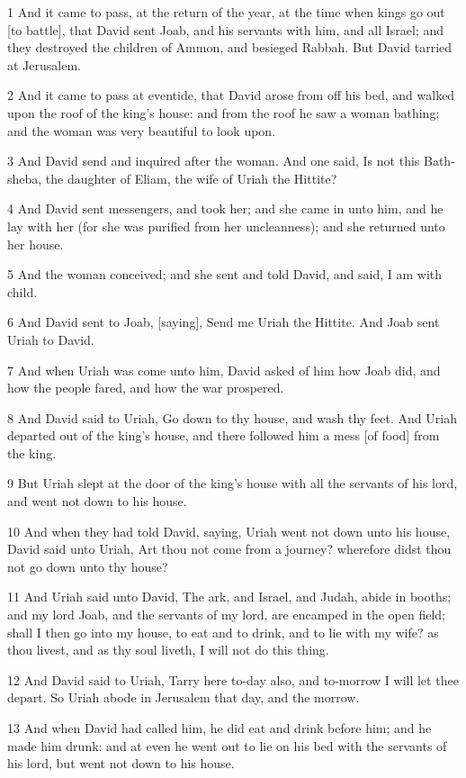 \par 1 And it came to pass, at the return of the year, at the time when kings go out [to battle], that David sent Joab, and his servants with him, and all Israel; and they destroyed the children of Ammon, and besieged Rabbah. But David tarried at Jerusalem.
\par 2 And it came to pass at eventide, that David arose from off his bed, and walked upon the roof of the king's house: and from the roof he saw a woman bathing; and the woman was very beautiful to look upon.
\par 3 And David send and inquired after the woman. And one said, Is not this Bath-sheba, the daughter of Eliam, the wife of Uriah the Hittite?
\par 4 And David sent messengers, and took her; and she came in unto him, and he lay with her (for she was purified from her uncleanness); and she returned unto her house.
\par 5 And the woman conceived; and she sent and told David, and said, I am with child.
\par 6 And David sent to Joab, [saying], Send me Uriah the Hittite. And Joab sent Uriah to David.
\par 7 And when Uriah was come unto him, David asked of him how Joab did, and how the people fared, and how the war prospered.
\par 8 And David said to Uriah, Go down to thy house, and wash thy feet. And Uriah departed out of the king's house, and there followed him a mess [of food] from the king.
\par 9 But Uriah slept at the door of the king's house with all the servants of his lord, and went not down to his house.
\par 10 And when they had told David, saying, Uriah went not down unto his house, David said unto Uriah, Art thou not come from a journey? wherefore didst thou not go down unto thy house?
\par 11 And Uriah said unto David, The ark, and Israel, and Judah, abide in booths; and my lord Joab, and the servants of my lord, are encamped in the open field; shall I then go into my house, to eat and to drink, and to lie with my wife? as thou livest, and as thy soul liveth, I will not do this thing.
\par 12 And David said to Uriah, Tarry here to-day also, and to-morrow I will let thee depart. So Uriah abode in Jerusalem that day, and the morrow.
\par 13 And when David had called him, he did eat and drink before him; and he made him drunk: and at even he went out to lie on his bed with the servants of his lord, but went not down to his house.
